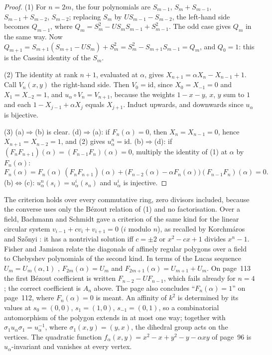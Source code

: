 \documentclass[11pt,a4paper]{amsart}
\theoremstyle{definition}
\theoremstyle{remark}
\newcommand{\id}{\mathrm{id}}
\begin{document}
\begin{proof}
(1) For $n = 2m$, the four polynomials are $S_{m-1}$, $S_m + S_{m-1}$, $S_{m-1} + S_{m-2}$, $S_{m-2}$; replacing $S_m$ by $US_{m-1} - S_{m-2}$, the left-hand side becomes $Q_{m-1}$, where $Q_m = S_m^2 - US_mS_{m-1} + S_{m-1}^2$. The odd case gives $Q_m$ in the same way. Now $Q_{m+1} = S_{m+1}(S_{m+1} - US_m) + S_m^2 = S_m^2 - S_{m+1}S_{m-1} = Q_m$, and $Q_0 = 1$: this is the Cassini identity of the $S_m$.

(2) The identity at rank $n+1$, evaluated at $\alpha$, gives $X_{n+1} = \alpha X_n - X_{n-1} + 1$. Call $V_n(x,y)$ the right-hand side. Then $V_0 = \id$, since $X_0 = X_{-1} = 0$ and $X_1 = X_{-2} = 1$, and $u_\alpha \circ V_n = V_{n+1}$, because the weights $1 - x - y$, $x$, $y$ sum to $1$ and each $1 - X_{j-1} + \alpha X_j$ equals $X_{j+1}$. Induct upwards, and downwards since $u_\alpha$ is bijective.

(3) (a)$\Rightarrow$(b) is clear. (d)$\Rightarrow$(a): if $F_n(\alpha) = 0$, then $X_n = X_{n-1} = 0$, hence $X_{n+1} = X_{n-2} = 1$, and (2) gives $u_\alpha^n = \id$. (b)$\Rightarrow$(d): if $(F_nF_{n+1})(\alpha) = (F_{n-1}F_n)(\alpha) = 0$, multiply the identity of (1) at $\alpha$ by $F_n(\alpha)$:
\[
F_n(\alpha) = F_n(\alpha)\,(F_nF_{n+1})(\alpha) + \bigl(F_{n-2}(\alpha) - \alpha F_n(\alpha)\bigr)(F_{n-1}F_n)(\alpha) = 0.
\]
(b)$\Leftrightarrow$(c): $u_\alpha^n(s_i) = u_\alpha^i(s_n)$ and $u_\alpha^i$ is injective.
\end{proof}

The criterion holds over every commutative ring, zero divisors included, because the converse uses only the Bézout relation of (1) and no factorisation. Over a field, Bachmann and Schmidt gave a criterion of the same kind for the linear circular system $v_{i-1} + cv_i + v_{i+1} = 0$ ($i$ modulo $n$), as recalled by Korchmáros and Sz\H{o}nyi \cite[(3.4)]{korchmarosszonyi2008}: it has a nontrivial solution iff $c = \pm2$ or $x^2 - cx + 1$ divides $x^n - 1$. Fisher and Jamison \cite{fisherjamison1998} relate the diagonals of affinely regular polygons over a field to Chebyshev polynomials of the second kind. In terms of the Lucas sequence $U_m = U_m(\alpha, 1)$ \cite{lucas1878}, $F_{2m}(\alpha) = U_m$ and $F_{2m+1}(\alpha) = U_{m+1} + U_m$. On page~113 the first Bézout coefficient is written $F_{n-2} - UF_{n-1}$, which fails already for $n = 4$; the correct coefficient is $A_n$ above. The page also concludes ``$F_n(\alpha) = 1$'' on page~112, where $F_n(\alpha) = 0$ is meant. An affinity of $k^2$ is determined by its values at $s_0 = (0,0)$, $s_1 = (1,0)$, $s_{-1} = (0,1)$, so a combinatorial automorphism of the polygon extends in at most one way; together with $\sigma_1 u_\alpha \sigma_1 = u_\alpha^{-1}$, where $\sigma_1(x,y) = (y,x)$, the dihedral group acts on the vertices. The quadratic function $f_\alpha(x,y) = x^2 - x + y^2 - y - \alpha xy$ of page~96 is $u_\alpha$-invariant and vanishes at every vertex.
\end{document}
